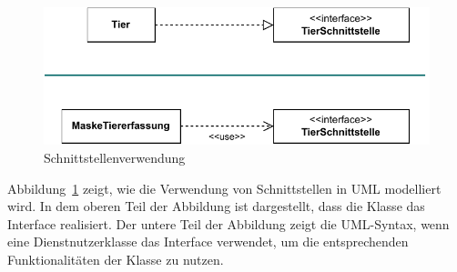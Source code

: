 \vspace{\baselineskip} %

\begin{figure}[h!]
	\centering
	\includegraphics[scale=1.0]{Bilder/Kapitel-8/schnittstellen_verwendung.pdf}
	\caption{Schnittstellenverwendung}
	\label{fig:schnittstellen_verwendung}
\end{figure}  

\vspace{\baselineskip} %

Abbildung~\ref{fig:schnittstellen_verwendung} zeigt, wie die Verwendung von Schnittstellen in UML modelliert wird. In dem oberen Teil der Abbildung ist dargestellt, dass die Klasse  das Interface  realisiert. Der untere Teil der Abbildung zeigt die UML-Syntax, wenn eine Dienstnutzerklasse das Interface verwendet, um die entsprechenden Funktionalitäten der Klasse  zu nutzen.



